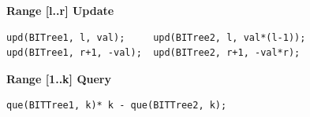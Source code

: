 \textbf{Range [l..r] Update}
\begin{verbatim}
upd(BITree1, l, val);     upd(BITree2, l, val*(l-1));
upd(BITree1, r+1, -val);  upd(BITree2, r+1, -val*r);
\end{verbatim}

\textbf{Range [1..k] Query}
\begin{verbatim}
que(BITTree1, k)* k - que(BITTree2, k);
\end{verbatim}
